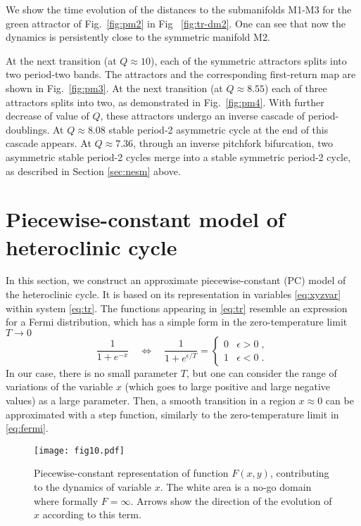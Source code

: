 \documentclass[3p,number,review,sort&compress]{elsarticle}
\begin{document}
We show the time evolution of the distances to the submanifolds M1-M3 
for the green attractor of Fig.~\ref{fig:pm2}
in Fig ~\ref{fig:tr-dm2}. One can see that now the dynamics is persistently
close to the symmetric manifold M2.

At the next transition (at $Q\approx 10$), each of the symmetric attractors
splits into two period-two bands. The attractors and the corresponding
first-return map are shown in Fig.~\ref{fig:pm3}. 
At the next transition (at $Q\approx 8.55$) each of three attractors splits into two,
as demonstrated in Fig.~\ref{fig:pm4}. With further decrease of value of $Q$, these attractors undergo an inverse cascade of period-doublings. At $Q\approx 8.08$ stable period-2  asymmetric cycle at the end of this cascade
appears. At $Q\approx 7.36$, through an inverse pitchfork bifurcation, two asymmetric stable period-2 cycles merge into a stable symmetric period-2 cycle, as
described in Section \ref{sec:nesm} above.


\section{Piecewise-constant model of heteroclinic cycle}
\label{sec:pla}
In this section, we construct an approximate piecewise-constant (PC) model
of the heteroclinic cycle. It is based on its representation in variables 
\eqref{eq:xyzvar} within system \eqref{eq:tr}. The functions appearing in
 \eqref{eq:tr} resemble an expression for a Fermi distribution, which has a simple
 form in the zero-temperature limit  $T\to 0$
 \begin{equation}
    \frac{1}{1+e^{-x}}\quad\Leftrightarrow\quad  \frac{1}{1+e^{\epsilon/T}}=\begin{cases} 0&\epsilon>0\;,\\ 1 & \epsilon<0\;.
\end{cases}
\label{eq:fermi}
 \end{equation}
In our case, there is no small parameter $T$, 
but one can consider
the range of variations of the variable $x$ (which goes to large positive and large negative values) as a large parameter. Then, a smooth transition in
a region $x\approx 0$ can be approximated with a step function, 
similarly to the zero-temperature limit in \eqref{eq:fermi}. 

\begin{figure}[!htb]
\centering
\texttt{[image: fig10.pdf]}
\caption{Piecewise-constant representation of function $F(x,y)$,
contributing to the dynamics of variable $x$. The white area is a no-go domain where 
formally $F=\infty$. Arrows show the direction of the evolution of $x$ according to this term.
}
\label{fig:funF}
\end{figure}
\end{document}
